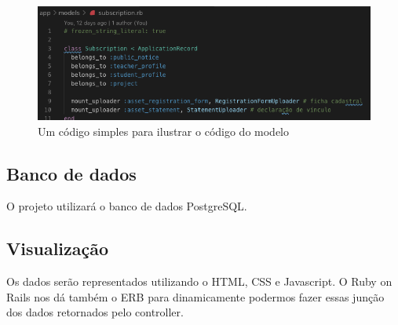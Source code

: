 \begin{figure}[htbp]
\hypertarget{arquitetura}{%
\caption{ Um código simples para ilustrar o código do modelo }
\begin{center}
\includegraphics[width=15cm]{Monografia-FormatoLatex/Imagens/exemplo-model.png}
\end{center}
}
\label{fig:service-model}
\end{figure}


\subsection{Banco de dados}

O projeto utilizará o banco de dados PostgreSQL.

\subsection{Visualização}

Os dados serão representados utilizando o HTML, CSS e Javascript. O Ruby on Rails nos dá também o ERB para dinamicamente podermos fazer essas junção dos dados retornados pelo controller.